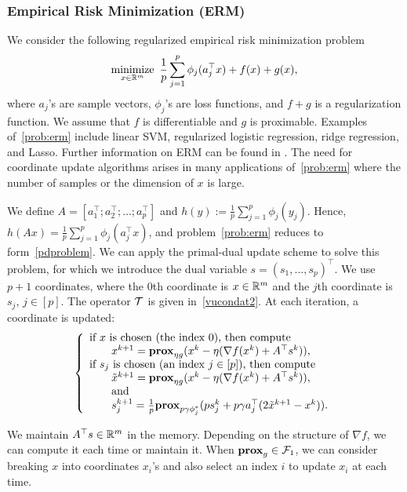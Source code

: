 \subsubsection{Empirical Risk Minimization (ERM)}
We consider the following regularized empirical risk minimization problem
\begin{equation}\label{prob:erm}
\Min_{x\in\RR^m}~ \frac{1}{p}\sum_{j=1}^p\phi_j(a_j^\top x)+f(x)+g(x),
\end{equation}
where $a_j$'s are sample vectors, $\phi_j$'s are loss functions, and $f+g$ is a regularization function. We assume that $f$ is differentiable and $g$ is proximable. Examples of~\eqref{prob:erm} include linear SVM, regularized logistic regression, ridge regression, and Lasso. Further information on ERM can be found in \cite{hastie2005elements}. The need for coordinate update algorithms arises in many applications of~\eqref{prob:erm} where the number of samples or the dimension of $x$ is large. 

We define $A=[a_1^\top;a_2^\top;\dots;a_p^\top]$ and $h(y):=\frac{1}{p}\sum_{j=1}^p\phi_j(y_j)$. Hence, $h(Ax)=\frac{1}{p}\sum_{j=1}^p\phi_j(a_j^\top x)$, and problem~\eqref{prob:erm} reduces to form~\eqref{pdproblem}.
We can apply the primal-dual update scheme to solve this problem, for which we introduce the dual variable $s = (s_1, ..., s_p)^\top$. We use $p+1$ coordinates, where the $0$th coordinate is $x\in\mathbb{R}^m$ and the $j$th coordinate is $s_j$, $j\in [p]$. The operator ${\mathcal{T}}$ is given in~\eqref{vucondat2}. At each iteration, a coordinate is updated:
\begin{equation}
{\left\{
\begin{array}{l}
\text{if }x\text{ is chosen (the index 0), then compute}\\
\qquad {x}^{k+1}=\prox_{\eta g}(x^k-\eta(\nabla f(x^k)+A^\top s^k)),\\
\text{if }s_j\text{ is chosen (an index $j \in [p]$), then compute}\\
\qquad\tilde{x}^{k+1}=\prox_{\eta g}(x^k-\eta(\nabla f(x^k)+A^\top s^k)),\\
\qquad\text{and}\\
\qquad{s}_j^{k+1}=\frac{1}{p}\prox_{p\gamma \phi_j^*} (ps_j^k+p\gamma a_j^\top(2\tilde{x}^{k+1}-x^k)).
\end{array}
\right.
}\end{equation}

We maintain $A^\top s\in \mathbb{R}^m$ in the memory. Depending on the structure of $\nabla f$, we can compute it each time or maintain it. When $\mathbf{prox}_g\in{\mathcal{F}}_1$, we can consider breaking $x$ into coordinates $x_i$'s and also select an index $i$ to update $x_i$ at each time.
